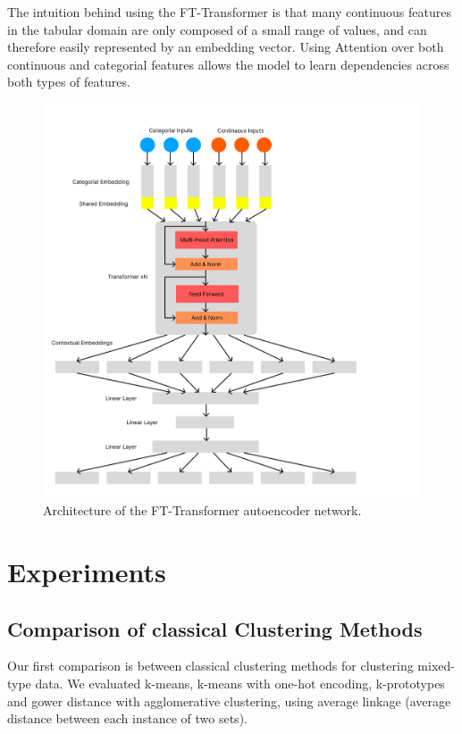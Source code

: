 The intuition behind using the FT-Transformer is that many continuous features in the tabular domain are only composed of a small range of values, and can therefore easily represented by an embedding vector. Using Attention over both continuous and categorial features allows the model to learn dependencies across both types of features.

\begin{figure}
\centering
	\includegraphics[width=1.2\linewidth]{ft_transformer_autoencoder.png}
	\caption{Architecture of the FT-Transformer autoencoder network.}
	\label{ft_transformer_autoencoder}
\end{figure}

\chapter{Experiments} \label{Experiments}

\section{Comparison of classical Clustering Methods}

Our first comparison is between classical clustering methods for clustering mixed-type data. We evaluated k-means, k-means with one-hot encoding, k-prototypes and gower distance with agglomerative clustering, using average linkage (average distance between each instance of two sets).


